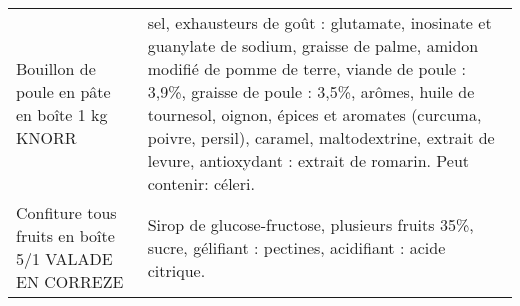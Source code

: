 \begin{longtable}{p{5cm}p{10cm}}
                                                            Bouillon de poule en pâte en boîte 1 kg KNORR &                                                                                                                                                                                                                                                                                                                                                                                                                                                                                                                                                                                                                                                                       sel, exhausteurs de goût : glutamate, inosinate et guanylate de sodium, graisse de palme, amidon modifié de pomme de terre, viande de poule : 3,9\%, graisse de poule : 3,5\%, arômes, huile de tournesol, oignon, épices et aromates (curcuma, poivre, persil), caramel, maltodextrine, extrait de levure, antioxydant : extrait de romarin. Peut contenir: céleri. \\
                                                     Confiture tous fruits en boîte 5/1 VALADE EN CORREZE &                                                                                                                                                                                                                                                                                                                                                                                                                                                                                                                                                                                                                                                                                                                                                                                                                                                                                                                               Sirop de glucose-fructose, plusieurs fruits 35\%, sucre, gélifiant : pectines, acidifiant : acide citrique. \\

\end{longtable}
